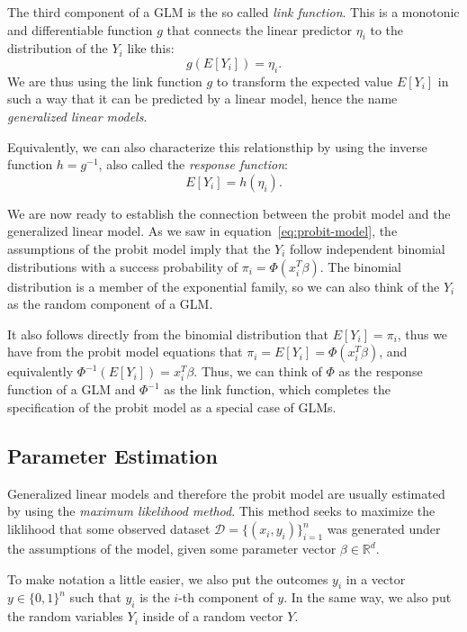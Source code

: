 The third component of a GLM is the so called \textit{link function}.
This is a monotonic and differentiable function
$g$
that connects the linear predictor $\eta_i$ to the distribution of the
$Y_i$ like this:
\begin{equation*}
    g(E[Y_i]) = \eta_i.
\end{equation*}
We are thus using the link function $g$ to transform the expected value
$E[Y_i]$ in such a way that it can be predicted by a linear model,
hence the name \textit{generalized linear models}.

Equivalently, we can also characterize this relationsthip by using
the inverse function $h = g^{-1}$,
also called the \textit{response function}:
\begin{equation*}
    E[Y_i] = h(\eta_i).
\end{equation*}

We are now ready to establish the connection between the probit model and
the generalized linear model.
As we saw in equation~\ref{eq:probit-model}, the assumptions of the
probit model imply that the $Y_i$ follow independent binomial distributions
with a success probability of $\pi_i = \Phi(x_i^T \beta)$.
The binomial distribution is a member of the exponential family, so
we can also think of the $Y_i$ as the random component of a GLM.

It also follows directly from the binomial distribution that
$E[Y_i] = \pi_i$, thus we have from the probit model equations that
$\pi_i = E[Y_i] = \Phi(x_i^T \beta)$, and equivalently
$\Phi^{-1}(E[Y_i]) = x_i^T \beta$. Thus, we can think of $\Phi$ as the response
function of a GLM and $\Phi^{-1}$ as the link function, which completes
the specification of the probit model as a special case of GLMs.

\subsection{Parameter Estimation}
\label{sec:parameter-estimation}

Generalized linear models and therefore the probit model are usually
estimated by using the \textit{maximum likelihood method}.
This method seeks to maximize the liklihood that some observed
dataset $\mathcal{D} = \{(x_i, y_i)\}_{i=1}^n$ was generated under the
assumptions of the model, given some parameter vector
$\beta \in \mathbb{R}^d$.

To make notation a little easier, we also put the outcomes $y_i$
in a vector $y \in \{0, 1\}^n$ such that $y_i$ is the $i$-th
component of $y$. In the same way, we also put the random
variables $Y_i$ inside of a random vector $Y$.

